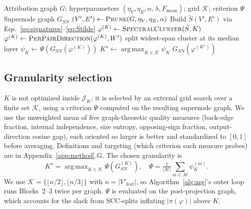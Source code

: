 \documentclass[table, 11pt]{article}
\DeclareMathOperator*{\argmax}{arg\,max}
\begin{document}
\begin{algorithm}[h]
\caption{Block-coordinate strategy on $\mathcal{J}_K$}
\label{alg:asg}
\begin{algorithmic}[1]
\REQUIRE Attribution graph $G$;
hyperparameters $(\eta_V, \eta_E, \alpha, \lambda, F_{\text{mean}})$;
grid $\mathcal{K}$; criterion $\Psi$
\ENSURE Supernode graph $G_{SN}$
\STATE $(V', E') \gets \textsc{Prune}(G, \eta_V, \eta_E, \alpha)$
\STATE Build $\tilde S(V', E')$ via
       Eqs.~\eqref{eq:signatures}--\eqref{eq:Stilde}
  \STATE $\varphi^{(K)} \gets
         \textsc{SpectralCluster}(\tilde S, K)$
  \STATE $\varphi^{(K)} \gets
         \textsc{PerPairDirection}(\varphi^{(K)}, W')$
    \STATE split widest-span cluster at its median layer
  \ENDWHILE
  \STATE $\psi_K \gets \Psi(G_{SN}(\varphi^{(K)}))$
\ENDFOR
\STATE $K^\star \gets \argmax_{K \in \mathcal{K}} \psi_K$
\RETURN $G_{SN}(\varphi^{(K^\star)})$
\end{algorithmic}
\end{algorithm}

\subsection{Granularity selection}\label{sec:k-selection}

$K$ is not optimized inside $\mathcal{J}_K$; it is selected by an
external grid search over a finite set $\mathcal{K}$, using a
criterion $\Psi$ computed on the resulting supernode graph. We use
the unweighted mean of five graph-theoretic quality measures
(back-edge fraction, internal independence, size entropy,
opposing-sign fraction, output-direction cosine gap), each oriented
so larger is better and standardized to $[0,1]$ before averaging.
Definitions and targeting (which criterion each measure probes) are
in Appendix~\ref{app:method}.G. The chosen granularity is
\begin{equation}
K^\star = \argmax_{K \in \mathcal{K}} \Psi(G_{SN}^{(K)}), \quad
\Psi = \tfrac{1}{|\mathcal{M}|}\sum_{m \in \mathcal{M}}\psi^{(m)}_K.
\label{eq:K-star}
\end{equation}
We use $\mathcal{K} = \{\lfloor n/2 \rfloor, \lfloor n/3 \rfloor\}$
with $n = |V'_{\text{feat}}|$, so Algorithm~\ref{alg:asg}'s outer
loop runs Blocks~2--3 twice per graph. $\Psi$ is evaluated on the
post-projection graph, which accounts for the slack from
SCC-splits inflating $|\pi(\varphi)|$ above $K$.
\end{document}
